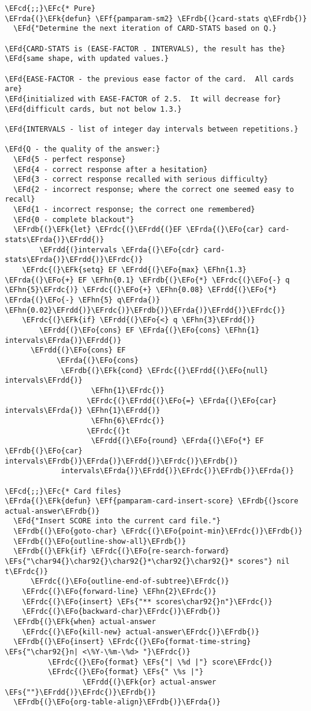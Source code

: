 \documentclass[a4wide,10pt]{article}
\newcommand{\EFc}[1]{\textcolor{EFc}{#1}} %
\newcommand{\EFcd}[1]{\textcolor{EFcd}{#1}} %
\newcommand{\EFs}[1]{\textcolor{EFs}{#1}} %
\newcommand{\EFd}[1]{\textcolor{EFd}{#1}} %
\newcommand{\EFk}[1]{\textcolor{EFk}{#1}} %
\newcommand{\EFf}[1]{\textcolor{EFf}{#1}} %
\newcommand{\EFo}[1]{\textcolor{EFo}{#1}} %
\newcommand{\EFhn}[1]{\textcolor{EFhn}{\textbf{#1}}} %
\newcommand{\EFrda}[1]{\textcolor{EFrda}{#1}} %
\newcommand{\EFrdb}[1]{\textcolor{EFrdb}{#1}} %
\newcommand{\EFrdc}[1]{\textcolor{EFrdc}{#1}} %
\newcommand{\EFrdd}[1]{\textcolor{EFrdd}{#1}} %
\begin{document}
\begin{Code}
\begin{Verbatim}
\EFcd{;;}\EFc{* Pure}
\EFrda{(}\EFk{defun} \EFf{pamparam-sm2} \EFrdb{(}card-stats q\EFrdb{)}
  \EFd{"Determine the next iteration of CARD-STATS based on Q.}

\EFd{CARD-STATS is (EASE-FACTOR . INTERVALS), the result has the}
\EFd{same shape, with updated values.}

\EFd{EASE-FACTOR - the previous ease factor of the card.  All cards are}
\EFd{initialized with EASE-FACTOR of 2.5.  It will decrease for}
\EFd{difficult cards, but not below 1.3.}

\EFd{INTERVALS - list of integer day intervals between repetitions.}

\EFd{Q - the quality of the answer:}
  \EFd{5 - perfect response}
  \EFd{4 - correct response after a hesitation}
  \EFd{3 - correct response recalled with serious difficulty}
  \EFd{2 - incorrect response; where the correct one seemed easy to recall}
  \EFd{1 - incorrect response; the correct one remembered}
  \EFd{0 - complete blackout"}
  \EFrdb{(}\EFk{let} \EFrdc{(}\EFrdd{(}EF \EFrda{(}\EFo{car} card-stats\EFrda{)}\EFrdd{)}
        \EFrdd{(}intervals \EFrda{(}\EFo{cdr} card-stats\EFrda{)}\EFrdd{)}\EFrdc{)}
    \EFrdc{(}\EFk{setq} EF \EFrdd{(}\EFo{max} \EFhn{1.3} \EFrda{(}\EFo{+} EF \EFhn{0.1} \EFrdb{(}\EFo{*} \EFrdc{(}\EFo{-} q \EFhn{5}\EFrdc{)} \EFrdc{(}\EFo{+} \EFhn{0.08} \EFrdd{(}\EFo{*} \EFrda{(}\EFo{-} \EFhn{5} q\EFrda{)} \EFhn{0.02}\EFrdd{)}\EFrdc{)}\EFrdb{)}\EFrda{)}\EFrdd{)}\EFrdc{)}
    \EFrdc{(}\EFk{if} \EFrdd{(}\EFo{<} q \EFhn{3}\EFrdd{)}
        \EFrdd{(}\EFo{cons} EF \EFrda{(}\EFo{cons} \EFhn{1} intervals\EFrda{)}\EFrdd{)}
      \EFrdd{(}\EFo{cons} EF
            \EFrda{(}\EFo{cons}
             \EFrdb{(}\EFk{cond} \EFrdc{(}\EFrdd{(}\EFo{null} intervals\EFrdd{)}
                    \EFhn{1}\EFrdc{)}
                   \EFrdc{(}\EFrdd{(}\EFo{=} \EFrda{(}\EFo{car} intervals\EFrda{)} \EFhn{1}\EFrdd{)}
                    \EFhn{6}\EFrdc{)}
                   \EFrdc{(}t
                    \EFrdd{(}\EFo{round} \EFrda{(}\EFo{*} EF \EFrdb{(}\EFo{car} intervals\EFrdb{)}\EFrda{)}\EFrdd{)}\EFrdc{)}\EFrdb{)}
             intervals\EFrda{)}\EFrdd{)}\EFrdc{)}\EFrdb{)}\EFrda{)}

\EFcd{;;}\EFc{* Card files}
\EFrda{(}\EFk{defun} \EFf{pamparam-card-insert-score} \EFrdb{(}score actual-answer\EFrdb{)}
  \EFd{"Insert SCORE into the current card file."}
  \EFrdb{(}\EFo{goto-char} \EFrdc{(}\EFo{point-min}\EFrdc{)}\EFrdb{)}
  \EFrdb{(}\EFo{outline-show-all}\EFrdb{)}
  \EFrdb{(}\EFk{if} \EFrdc{(}\EFo{re-search-forward} \EFs{"\char94{}\char92{}\char92{}*\char92{}\char92{}* scores"} nil t\EFrdc{)}
      \EFrdc{(}\EFo{outline-end-of-subtree}\EFrdc{)}
    \EFrdc{(}\EFo{forward-line} \EFhn{2}\EFrdc{)}
    \EFrdc{(}\EFo{insert} \EFs{"** scores\char92{}n"}\EFrdc{)}
    \EFrdc{(}\EFo{backward-char}\EFrdc{)}\EFrdb{)}
  \EFrdb{(}\EFk{when} actual-answer
    \EFrdc{(}\EFo{kill-new} actual-answer\EFrdc{)}\EFrdb{)}
  \EFrdb{(}\EFo{insert} \EFrdc{(}\EFo{format-time-string} \EFs{"\char92{}n| <\%Y-\%m-\%d> "}\EFrdc{)}
          \EFrdc{(}\EFo{format} \EFs{"| \%d |"} score\EFrdc{)}
          \EFrdc{(}\EFo{format} \EFs{" \%s |"}
                  \EFrdd{(}\EFk{or} actual-answer \EFs{""}\EFrdd{)}\EFrdc{)}\EFrdb{)}
  \EFrdb{(}\EFo{org-table-align}\EFrdb{)}\EFrda{)}


\end{Verbatim}
\end{Code}
\end{document}
